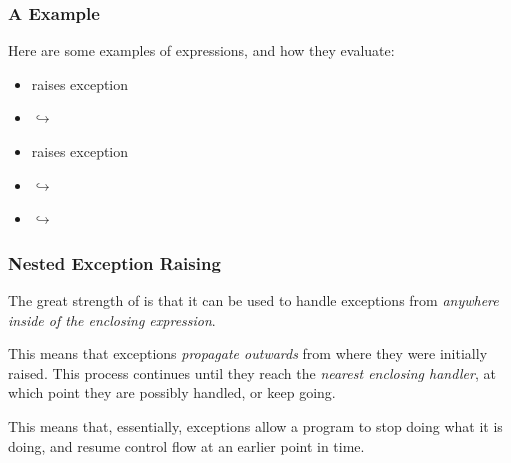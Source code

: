 \documentclass[aspectratio=169]{beamer}
\begin{document}
\begin{frame}[fragile]
  \frametitle{A  Example}

  Here are some examples of  expressions, and how they evaluate:

  \pause
  \vspace{\fill}

  \begin{itemize}
    \item {} raises exception 
    \item {} $\hookrightarrow$ 
    \item {} raises exception 
    \item {} $\hookrightarrow$ 
    \item {} $\hookrightarrow$ 
  \end{itemize}

\end{frame}

\begin{frame}[fragile]
  \frametitle{Nested Exception Raising}

  \rprs

  The great strength of  is that it can be used to handle
  exceptions from \textit{anywhere inside of the enclosing expression}.

  \pause
  \vspace{\fill}


  \pause
  \vspace{\fill}

  This means that exceptions \textit{propagate outwards} from where
  they were initially raised. This process continues until they reach
  the \textit{nearest enclosing handler}, at which point they are
  possibly handled, or keep going.

  \pause
  \vspace{\fill}

  This means that, essentially, exceptions allow a program to stop
  doing what it is doing, and resume control flow at an earlier point
  in time.
\end{frame}
\end{document}
